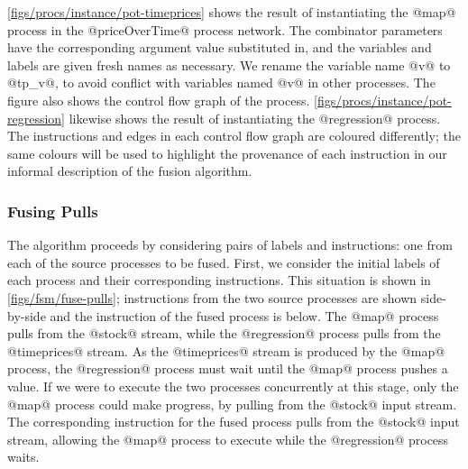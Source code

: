 \autoref{figs/procs/instance/pot-timeprices} shows the result of instantiating the @map@ process in the @priceOverTime@ process network.
The combinator parameters have the corresponding argument value substituted in, and the variables and labels are given fresh names as necessary.
We rename the variable name @v@ to @tp_v@, to avoid conflict with variables named @v@ in other processes.
The figure also shows the control flow graph of the process.
\autoref{figs/procs/instance/pot-regression} likewise shows the result of instantiating the @regression@ process.
The instructions and edges in each control flow graph are coloured differently; the same colours will be used to highlight the provenance of each instruction in our informal description of the fusion algorithm.



\subsubsection{Fusing Pulls}
\label{s:Fusion:FusingPulls}

The algorithm proceeds by considering pairs of labels and instructions: one from each of the source processes to be fused.
First, we consider the initial labels of each process and their corresponding instructions.
This situation is shown in \autoref{figs/fsm/fuse-pulls}; instructions from the two source processes are shown side-by-side and the instruction of the fused process is below.
The @map@ process pulls from the @stock@ stream, while the @regression@ process pulls from the @timeprices@ stream.
As the @timeprices@ stream is produced by the @map@ process, the @regression@ process must wait until the @map@ process pushes a value.
If we were to execute the two processes concurrently at this stage, only the @map@ process could make progress, by pulling from the @stock@ input stream.
The corresponding instruction for the fused process pulls from the @stock@ input stream, allowing the @map@ process to execute while the @regression@ process waits.



